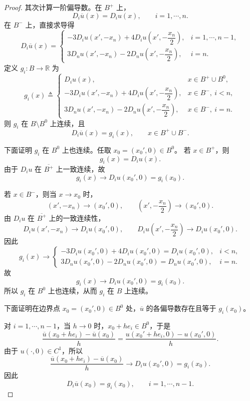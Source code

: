 \documentclass[../../main.tex]{subfiles}
\begin{document}
\begin{proof}
其次计算一阶偏导数。在 \(B^{+}\) 上，
\[
D_i\overline u(x)=D_i u(x),\qquad i=1,\cdots,n.
\]
在 \(B^{-}\) 上，直接求导得
\[
D_i\overline u(x)=
\begin{cases}
-3D_i u(x',-x_n)+4D_i u\left(x',-\dfrac{x_n}{2}\right), & i=1,\cdots,n-1,\\[6pt]
3D_n u(x',-x_n)-2D_n u\left(x',-\dfrac{x_n}{2}\right), & i=n.
\end{cases}
\]
定义 \(g_i:B\to\mathbb{R}\) 为
\[
g_i(x)\triangleq
\begin{cases}
D_i u(x), & x\in B^{+}\cup B^{0},\\[4pt]
-3D_i u(x',-x_n)+4D_i u\left(x',-\dfrac{x_n}{2}\right), & x\in B^{-},\ i<n,\\[6pt]
3D_n u(x',-x_n)-2D_n u\left(x',-\dfrac{x_n}{2}\right), & x\in B^{-},\ i=n.
\end{cases}
\]
则 \(g_i\) 在 \(B\setminus B^{0}\) 上连续，且
\[
D_i\overline u(x)=g_i(x),\qquad x\in B^{+}\cup B^{-}.
\]

下面证明 \(g_i\) 在 \(B^{0}\) 上也连续。任取 \(x_0=(x_0',0)\in B^{0}\)。
若 \(x\in B^{+}\)，则
\[
g_i(x)=D_i u(x).
\]
由于 \(D_i u\) 在 \(\overline{B^{+}}\) 上一致连续，故
\[
g_i(x)\to D_i u(x_0',0)=g_i(x_0).
\]

若 \(x\in B^{-}\)，则当 \(x\to x_0\) 时，
\[
(x',-x_n)\to(x_0',0),\qquad
\left(x',-\frac{x_n}{2}\right)\to(x_0',0).
\]
由 \(D_i u\) 在 \(\overline{B^{+}}\) 上的一致连续性，
\[
D_i u(x',-x_n)\to D_i u(x_0',0),\qquad
D_i u\left(x',-\frac{x_n}{2}\right)\to D_i u(x_0',0).
\]
因此
\[
g_i(x)\to
\begin{cases}
-3D_i u(x_0',0)+4D_i u(x_0',0)=D_i u(x_0',0), & i<n,\\[4pt]
3D_n u(x_0',0)-2D_n u(x_0',0)=D_n u(x_0',0), & i=n.
\end{cases}
\]
故
\[
g_i(x)\to D_i u(x_0',0)=g_i(x_0).
\]
所以 \(g_i\) 在 \(B^{0}\) 上也连续，从而 \(g_i\) 在 \(B\) 上连续。

下面证明在边界点 \(x_0=(x_0',0)\in B^{0}\) 处，\(\overline u\) 的各偏导数存在且等于 \(g_i(x_0)\)。

对 \(i=1,\cdots,n-1\)，当 \(h\to0\) 时，\(x_0+he_i\in B^{0}\)，于是
\[
\frac{\overline u(x_0+he_i)-\overline u(x_0)}{h}
=
\frac{u(x_0'+he_i,0)-u(x_0',0)}{h}.
\]
由于 \(u(\cdot,0)\in C^{1}\)，所以
\[
\frac{\overline u(x_0+he_i)-\overline u(x_0)}{h}
\to D_i u(x_0',0)=g_i(x_0).
\]
因此
\[
D_i\overline u(x_0)=g_i(x_0),\qquad i=1,\cdots,n-1.
\]


\end{proof}
\end{document}
